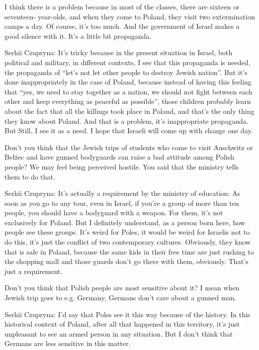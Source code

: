 I think there is a problem because in most of the classes, there are sixteen or seventeen- year-olds, and when they come to Poland, they visit two extermination camps a day. Of course, it’s too much. And the government of Israel makes a good silence with it. It’s a little bit propaganda.  

Serhii Czupryna: It’s tricky because in the present situation in Israel, both political and military, in different contexts, I see that this propaganda is needed, the propaganda of “let’s not let other people to destroy Jewish nation”. But it’s done inappropriately in the case of Poland, because instead of having this feeling that “yes, we need to stay together as a nation, we should not fight between each other and keep everything as peaceful as possible”, those children probably learn about the fact that all the killings took place in Poland, and that’s the only thing they know about Poland. And that is a problem, it’s inappropriate propaganda. But Still, I see it as a need. I hope that Israeli will come up with change one day.  

Don’t you think that the Jewish trips of students who come to visit Auschwitz or Bełżec and have gunned bodyguards can raise a bad attitude among Polish people? We may feel being perceived hostile. You said that the ministry tells them to do that. 

Serhii Czupryna: It’s actually a requirement by the ministry of education: As soon as you go to any tour, even in Israel, if you’re a group of more than ten people, you should have a bodyguard with a weapon. For them, it’s not exclusively for Poland. But I definitely understand, as a person born here, how people see these groups. It’s weird for Poles, it would be weird for Israelis not to do this, it’s just the conflict of two contemporary cultures. Obviously, they know that is safe in Poland, because the same kids in their free time are just rushing to the shopping mall and those guards don’t go there with them, obviously. That’s just a requirement.  

 Don’t you think that Polish people are most sensitive about it? I mean when Jewish trip goes to e.g. Germany, Germans don’t care about a gunned man. 

Serhii Czupryna: I’d say that Poles see it this way because of the history. In this historical context of Poland, after all that happened in this territory, it’s just unpleasant to see an armed person in any situation. But I don’t think that Germans are less sensitive in this matter.  

